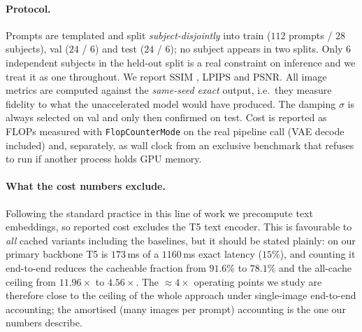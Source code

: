 \documentclass[10pt,twocolumn,letterpaper]{article}
\begin{document}
\paragraph{Protocol.} Prompts are templated and split \emph{subject-disjointly} into
train ($112$ prompts / $28$ subjects), val ($24$ / $6$) and test ($24$ / $6$); no
subject appears in two splits. Only $6$ independent subjects in the held-out split is
a real constraint on inference and we treat it as one throughout. We report SSIM \cite{wang2004ssim}, LPIPS \cite{zhang2018lpips} and PSNR.
All image metrics are computed against the \emph{same-seed exact}
output, i.e.\ they measure fidelity to what the unaccelerated model would have
produced. The damping $\sigma$ is always selected on val and only then confirmed on
test. Cost is reported as FLOPs measured with \texttt{FlopCounterMode} on the real
pipeline call (VAE decode included) and, separately, as wall clock from an exclusive
benchmark that refuses to run if another process holds GPU memory.

\paragraph{What the cost numbers exclude.} Following the standard practice in this
line of work we precompute text embeddings, so reported cost excludes the T5 text
encoder. This is favourable to \emph{all} cached variants including the baselines,
but it should be stated plainly: on our primary backbone T5 is $173$\,ms of a
$1160$\,ms exact latency ($15\%$), and counting it end-to-end reduces the cacheable fraction
from $91.6\%$ to $78.1\%$ and the all-cache ceiling from $11.96\times$ to
$4.56\times$. The $\approx\!4\times$ operating points we study are therefore close to
the ceiling of the whole approach under single-image end-to-end accounting; the
amortised (many images per prompt) accounting is the one our numbers describe.



{\small


}
\end{document}
